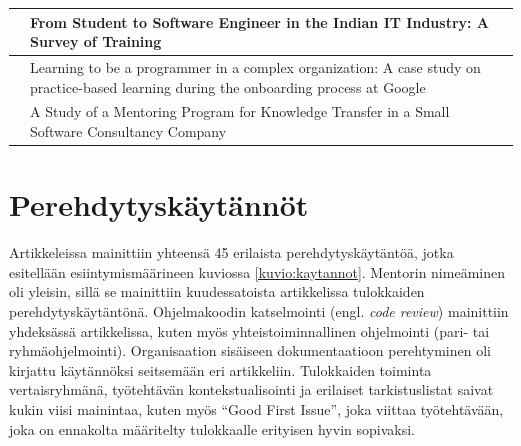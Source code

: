 \documentclass[utf8]{gradu3}
\begin{document}
\begin{footnotesize}
\begin{longtable}{ m{4cm}  m{10.5cm} }
\hline
\textcite{kulkarni-ym-2010} & From Student to Software Engineer in the Indian IT Industry: A Survey of Training \\
\hline
 \textcite{johnson-senges-2010} & Learning to be a programmer in a complex organization: A case study on practice-based learning during the onboarding process at Google\\
\hline
\textcite{bjornson-dingsøyr-2005} & A Study of a Mentoring Program for Knowledge Transfer in a Small Software Consultancy Company \\

\hline
\end{longtable}
\end{footnotesize}


\section{Perehdytyskäytännöt}
\label{luku-tulokset-kaytannot}

Artikkeleissa mainittiin yhteensä 45 erilaista perehdytyskäytäntöä, jotka esitellään esiintymismäärineen kuviossa \ref{kuvio:kaytannot}. Mentorin nimeäminen oli yleisin, sillä se mainittiin kuudessatoista artikkelissa tulokkaiden perehdytyskäytäntönä. Ohjelmakoodin katselmointi (engl. \textit{code review}) mainittiin yhdeksässä artikkelissa, kuten myös yhteistoiminnallinen ohjelmointi (pari- tai ryhmäohjelmointi). Organisaation sisäiseen dokumentaatioon perehtyminen oli kirjattu käytännöksi seitsemään eri artikkeliin. Tulokkaiden toiminta vertaisryhmänä, työtehtävän kontekstualisointi ja erilaiset tarkistuslistat saivat kukin viisi mainintaa, kuten myös ``Good First Issue'', joka viittaa työtehtävään, joka on ennakolta määritelty tulokkaalle erityisen hyvin sopivaksi.
\end{document}
